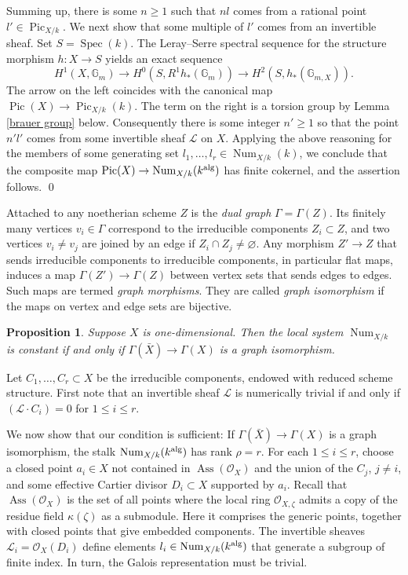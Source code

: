 \documentclass[oneside, 12pt]{amsart}
\newcommand\mylabel[1]{\label{#1}\marginpar{\vspace{-1ex}\medskip\medskip\footnotesize \tt #1}}
\renewcommand\mylabel[1]{\label{#1}}
\newtheorem{proposition}[theorem]{Proposition}
\theoremstyle{definition}
\theoremstyle{remark}
\newcommand{\GG}{\mathbb{G}}
\newcommand{\shL}{\mathscr{L}}
\newcommand{\alg}{\text{\rm alg}}
\newcommand{\Ass}{\operatorname{Ass}}
\newcommand{\lra}{\longrightarrow}
\newcommand{\Num}{\operatorname{Num}}
\renewcommand{\O}{\mathscr{O}}
\newcommand{\Pic}{\operatorname{Pic}}
\newcommand{\ra}{\rightarrow}
\newcommand{\Spec}{\operatorname{Spec}}
\newcommand{\bX}{{\bar{X}}}
\begin{document}
Summing up,  there is some $n\geq 1$ such that $nl$ comes from a rational point $l'\in \Pic_{X/k}$.
We next show that some multiple of $l'$ comes from an invertible sheaf. Set $S=\Spec(k)$.
The Leray--Serre spectral sequence for the structure morphism
$h:X\ra S$ yields an exact sequence
$$
H^1(X,\GG_m)\lra H^0(S,R^1h_*(\GG_m))\lra H^2(S,h_*(\GG_{m,X})).
$$
The arrow on the left coincides with the canonical map $\Pic(X)\ra \Pic_{X/k}(k)$. The 
term on the right is a torsion group by Lemma \ref{brauer group} below.
Consequently there is some integer $n'\geq 1$ so that the point  $n'l'$ comes
from some invertible sheaf $\shL$ on $X$. 
Applying the above reasoning for the members of  some generating set $l_1,\ldots, l_r\in\Num_{X/k}(k)$,
we conclude that the composite map $\Pic(X)\ra\Num_{X/k}(k^\alg)$ has finite cokernel, and the assertion follows.
\qed

\medskip
Attached to any noetherian scheme $Z$ is the \emph{dual graph} $\Gamma=\Gamma(Z)$. Its 
finitely many vertices $v_i\in\Gamma$ correspond to the irreducible components $Z_i\subset Z$, and two vertices $v_i\neq v_j$ are joined by an edge if $Z_i\cap Z_j\neq\varnothing$. Any morphism $Z'\ra Z$ that sends irreducible components to irreducible components,
in particular flat maps,  induces a map $\Gamma(Z')\ra\Gamma(Z)$ between vertex sets that sends edges to edges.
Such maps are termed \emph{graph morphisms}. They are called  \emph{graph isomorphism}
if the maps on vertex and edge sets are bijective.

\begin{proposition}
\mylabel{graph isomorphism}
Suppose   $X$ is one-dimensional. Then the local system  $\Num_{X/k}$ is constant if and only if 
 $\Gamma(\bX)\ra\Gamma(X)$ is a graph isomorphism.
\end{proposition}

\proof
Let $C_1,\ldots,C_r\subset X$ be the irreducible components, endowed with reduced scheme structure.
First note that an  invertible sheaf $\shL$ is numerically trivial if and only if $(\shL\cdot C_i)=0$ for $1\leq i\leq r$.

We now show that our condition is sufficient: If $\Gamma(\bX)\ra\Gamma(X)$ is a graph isomorphism,
the stalk $\Num_{X/k}(k^\alg)$ has rank $\rho=r$.
For each $1\leq i\leq r$, choose a closed point $a_i\in X$ not contained in $\Ass(\O_X)$
and the union of the $C_j$, $j\neq i$, and some effective Cartier divisor $D_i\subset X$ supported by $a_i$.
Recall that $\Ass(\O_X)$ is the set of all points where the local ring $\O_{X,\zeta}$ admits a copy of the
residue field $\kappa(\zeta)$ as a submodule. Here it  comprises the generic points, together with closed points that give
embedded components.
The   invertible sheaves $\shL_i=\O_X(D_i)$ define elements $l_i\in\Num_{X/k}(k^\alg)$ that
generate a subgroup of finite index. In turn, the Galois representation must be trivial.
\end{document}
